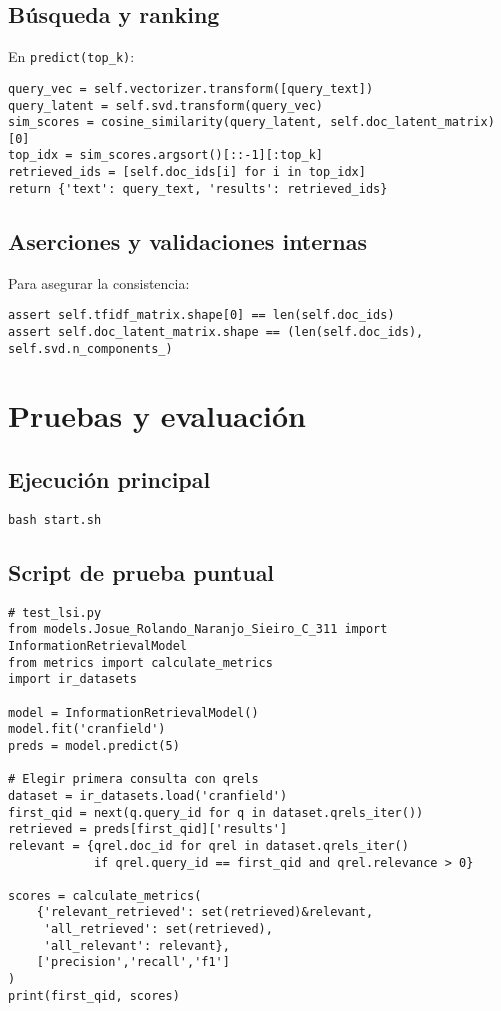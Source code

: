 \documentclass[12pt,a4paper]{report}
\begin{document}
\section{Búsqueda y ranking}
En \texttt{predict(top\_k)}:
\begin{verbatim}
query_vec = self.vectorizer.transform([query_text])
query_latent = self.svd.transform(query_vec)
sim_scores = cosine_similarity(query_latent, self.doc_latent_matrix)[0]
top_idx = sim_scores.argsort()[::-1][:top_k]
retrieved_ids = [self.doc_ids[i] for i in top_idx]
return {'text': query_text, 'results': retrieved_ids}
\end{verbatim}

\section{Aserciones y validaciones internas}
Para asegurar la consistencia:
\begin{verbatim}
assert self.tfidf_matrix.shape[0] == len(self.doc_ids)
assert self.doc_latent_matrix.shape == (len(self.doc_ids), self.svd.n_components_)
\end{verbatim}

\chapter{Pruebas y evaluación}
\section{Ejecución principal}
\begin{verbatim}
bash start.sh
\end{verbatim}

\section{Script de prueba puntual}
\begin{verbatim}
# test_lsi.py
from models.Josue_Rolando_Naranjo_Sieiro_C_311 import InformationRetrievalModel
from metrics import calculate_metrics
import ir_datasets

model = InformationRetrievalModel()
model.fit('cranfield')
preds = model.predict(5)

# Elegir primera consulta con qrels
dataset = ir_datasets.load('cranfield')
first_qid = next(q.query_id for q in dataset.qrels_iter())
retrieved = preds[first_qid]['results']
relevant = {qrel.doc_id for qrel in dataset.qrels_iter()
            if qrel.query_id == first_qid and qrel.relevance > 0}

scores = calculate_metrics(
    {'relevant_retrieved': set(retrieved)&relevant,
     'all_retrieved': set(retrieved),
     'all_relevant': relevant},
    ['precision','recall','f1']
)
print(first_qid, scores)
\end{verbatim}
\end{document}
